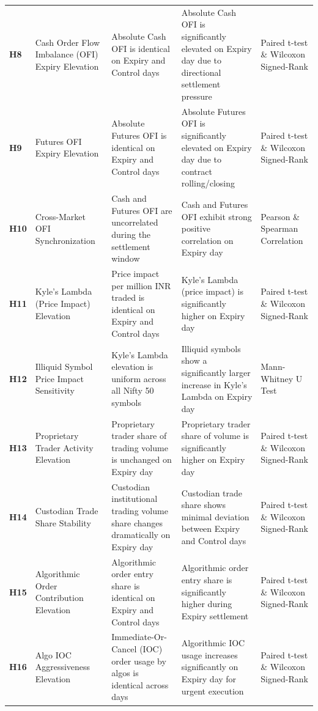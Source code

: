 \documentclass[11pt,a4paper]{article}
\begin{document}
\begin{longtable}{p{0.8cm} p{3.2cm} p{4.2cm} p{4.2cm} p{2.8cm}}
\addlinespace[3pt]
\textbf{H8} & Cash Order Flow Imbalance (OFI) Expiry Elevation & Absolute Cash OFI is identical on Expiry and Control days & Absolute Cash OFI is significantly elevated on Expiry day due to directional settlement pressure & Paired t-test \& Wilcoxon Signed-Rank \\
\addlinespace[3pt]
\textbf{H9} & Futures OFI Expiry Elevation & Absolute Futures OFI is identical on Expiry and Control days & Absolute Futures OFI is significantly elevated on Expiry day due to contract rolling/closing & Paired t-test \& Wilcoxon Signed-Rank \\
\addlinespace[3pt]
\textbf{H10} & Cross-Market OFI Synchronization & Cash and Futures OFI are uncorrelated during the settlement window & Cash and Futures OFI exhibit strong positive correlation on Expiry day & Pearson \& Spearman Correlation \\
\addlinespace[3pt]
\textbf{H11} & Kyle's Lambda (Price Impact) Elevation & Price impact per million INR traded is identical on Expiry and Control days & Kyle's Lambda (price impact) is significantly higher on Expiry day & Paired t-test \& Wilcoxon Signed-Rank \\
\addlinespace[3pt]
\textbf{H12} & Illiquid Symbol Price Impact Sensitivity & Kyle's Lambda elevation is uniform across all Nifty 50 symbols & Illiquid symbols show a significantly larger increase in Kyle's Lambda on Expiry day & Mann-Whitney U Test \\
\addlinespace[3pt]
\textbf{H13} & Proprietary Trader Activity Elevation & Proprietary trader share of trading volume is unchanged on Expiry day & Proprietary trader share of volume is significantly higher on Expiry day & Paired t-test \& Wilcoxon Signed-Rank \\
\addlinespace[3pt]
\textbf{H14} & Custodian Trade Share Stability & Custodian institutional trading volume share changes dramatically on Expiry day & Custodian trade share shows minimal deviation between Expiry and Control days & Paired t-test \& Wilcoxon Signed-Rank \\
\addlinespace[3pt]
\textbf{H15} & Algorithmic Order Contribution Elevation & Algorithmic order entry share is identical on Expiry and Control days & Algorithmic order entry share is significantly higher during Expiry settlement & Paired t-test \& Wilcoxon Signed-Rank \\
\addlinespace[3pt]
\textbf{H16} & Algo IOC Aggressiveness Elevation & Immediate-Or-Cancel (IOC) order usage by algos is identical across days & Algorithmic IOC usage increases significantly on Expiry day for urgent execution & Paired t-test \& Wilcoxon Signed-Rank \\

\end{longtable}
\end{document}
